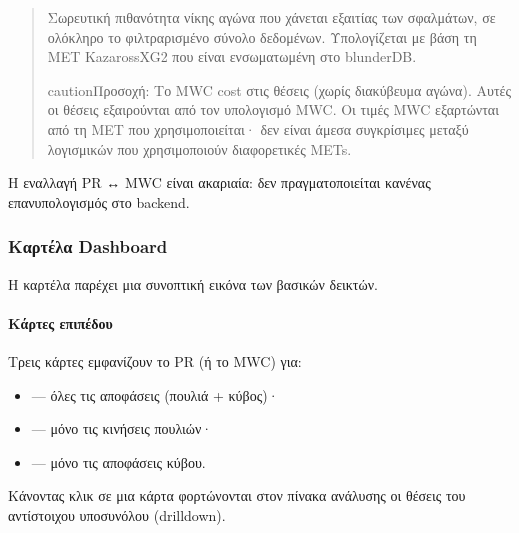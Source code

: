 \documentclass[letterpaper,10pt,greek]{sphinxmanual}
\begin{document}
\sphinxAtStartPar
{}
\begin{quote}

\sphinxAtStartPar
Σωρευτική πιθανότητα νίκης αγώνα που χάνεται εξαιτίας των σφαλμάτων, σε ολόκληρο το φιλτραρισμένο σύνολο δεδομένων. Υπολογίζεται με βάση τη MET Kazaross\sphinxhyphen{}XG2 που είναι ενσωματωμένη στο blunderDB.

\begin{sphinxadmonition}{caution}{Προσοχή:}
\sphinxAtStartPar
Το MWC cost  στις θέσεις  (χωρίς διακύβευμα αγώνα). Αυτές οι θέσεις εξαιρούνται από τον υπολογισμό MWC. Οι τιμές MWC εξαρτώνται από τη MET που χρησιμοποιείται· δεν είναι άμεσα συγκρίσιμες μεταξύ λογισμικών που χρησιμοποιούν διαφορετικές METs.
\end{sphinxadmonition}
\end{quote}

\sphinxAtStartPar
Η εναλλαγή PR ↔ MWC είναι ακαριαία: δεν πραγματοποιείται κανένας επανυπολογισμός στο backend.


\subsubsection{Καρτέλα Dashboard}
\label{\detokenize{manuel:onglet-dashboard}}
\sphinxAtStartPar
Η καρτέλα  παρέχει μια συνοπτική εικόνα των βασικών δεικτών.


\paragraph{Κάρτες επιπέδου}
\label{\detokenize{manuel:cartes-de-niveau}}
\sphinxAtStartPar
Τρεις κάρτες εμφανίζουν το PR (ή το MWC) για:
\begin{itemize}
\item {} 
\sphinxAtStartPar
{} — όλες τις αποφάσεις (πουλιά + κύβος)·

\item {} 
\sphinxAtStartPar
{} — μόνο τις κινήσεις πουλιών·

\item {} 
\sphinxAtStartPar
{} — μόνο τις αποφάσεις κύβου.

\end{itemize}

\sphinxAtStartPar
Κάνοντας κλικ σε μια κάρτα φορτώνονται στον πίνακα ανάλυσης οι θέσεις του αντίστοιχου υποσυνόλου (drill\sphinxhyphen{}down).
\end{document}
